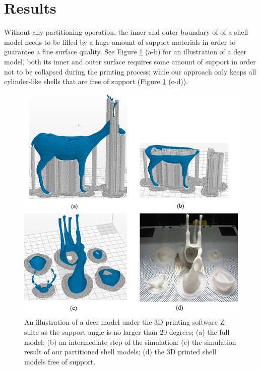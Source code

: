 \section{Results}

Without any partitioning operation, the inner and outer boundary of of a shell model needs to be filled by a huge amount of support materials in order to guarantee a fine surface quality. See Figure \ref{fig:dear-simulation} (a-b) for an illustration of a deer model, both its inner and outer surface requires some amount of support in order not to be collapsed during the printing process; while our approach only keeps all cylinder-like shells that are free of support (Figure \ref{fig:dear-simulation} (c-d)).

\begin{figure}[tbp]
  \centering
  \includegraphics[width=\linewidth]{figs/dear-simulation.png}
  \caption{\label{fig:dear-simulation}%
           An illustration of a deer model under the 3D printing software Z-suite as the support angle is no larger than 20 degrees; (a) the full model; (b) an intermediate step of the simulation; (c) the simulation result of our partitioned shell models; (d) the 3D printed shell models free of support.}
\end{figure}


